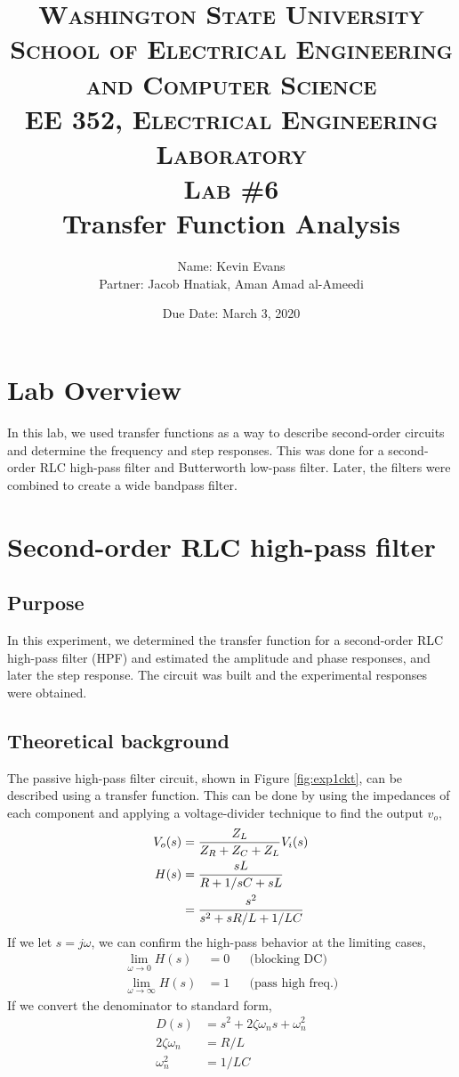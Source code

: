 \documentclass{report}
\title{
	\textsc{ \small
		Washington State University \\
		School of Electrical Engineering and Computer Science \\
		EE 352, Electrical Engineering Laboratory
	} \\
	{\textsc{\small Lab \#6}} \\
	Transfer Function Analysis
}
\author{
	Name: Kevin Evans \\
	Partner: Jacob Hnatiak, Aman Amad al-Ameedi
}
\date{Due Date: March 3, 2020}
\begin{document}
\maketitle

\section*{Lab Overview}
In this lab, we used transfer functions as a way to describe second-order circuits and determine the frequency and step responses. This was done for a second-order RLC high-pass filter and Butterworth low-pass filter. Later, the filters were combined to create a wide bandpass filter.

\section{Second-order RLC high-pass filter}
\subsection{Purpose}
In this experiment, we determined the transfer function for a second-order RLC high-pass filter (HPF) and estimated the amplitude and phase responses, and later the step response. The circuit was built and the experimental responses were obtained.

\subsection{Theoretical background}
The passive high-pass filter circuit, shown in Figure \ref{fig:exp1ckt}, can be described using a transfer function. This can be done by using the impedances of each component and applying a voltage-divider technique to find the output $v_o$, \begin{align}
	V_o(s) & = \frac{Z_L}{Z_R + Z_C + Z_L} V_i(s) \notag \\
	H(s) & = \frac{sL}{R + 1/sC + sL} \notag \\
		& = \frac{s^2}{s^2 + sR/L + 1/LC}
\end{align}
If we let $s=j\omega$, we can confirm the high-pass behavior at the limiting cases, \begin{align*}
	\lim_{\omega \to 0} H(s) & = 0 && \text{(blocking DC)} \\
	\lim_{\omega \to \infty} H(s) & = 1 && \text{(pass high freq.)}
\end{align*}
If we convert the denominator to standard form, \begin{subequations}
	\begin{align}
		D(s) & = s^2 + 2 \zeta \omega_n s + \omega_n^2 \\
		2 \zeta \omega_n & = R/L 	\label{eq:exp1zeta} \\
		\omega_n^2 & = 1/LC 	\label{eq:exp1omega}
	\end{align}
\end{subequations}
\end{document}
